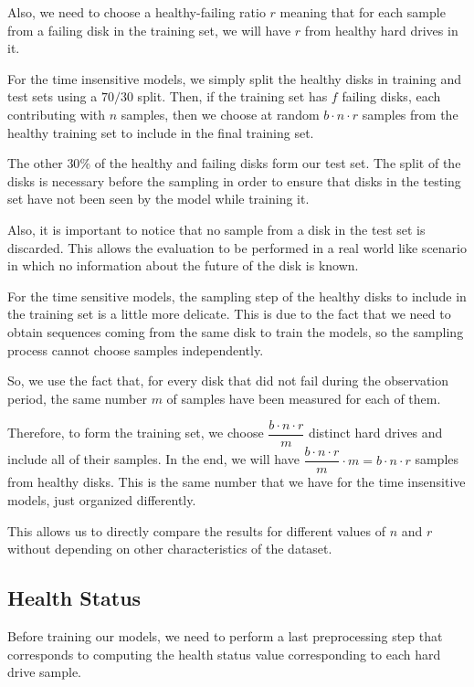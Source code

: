 Also, we need to choose a healthy-failing ratio $r$ meaning that for each sample from a failing disk in the training set, we will have $r$ from healthy hard drives in it.

For the time insensitive models, we simply split the healthy disks in training and test sets using a $70/30$ split.
Then, if the training set has $f$ failing disks, each contributing with $n$ samples, then we choose at random $b\cdot n \cdot r$ samples from the healthy training set to include in the final training set.

The other $30\%$ of the healthy and failing disks form our test set.
The split of the disks is necessary before the sampling in order to ensure that disks in the testing set have not been seen by the model while training it.

Also, it is important to notice that no sample from a disk in the test set is discarded.
This allows the evaluation to be performed in a real world like scenario in which no information about the future of the disk is known. 

For the time sensitive models, the sampling step of the healthy disks to include in the training set is a little more delicate.
This is due to the fact that we need to obtain sequences coming from the same disk to train the models, so the sampling process cannot choose samples independently.

So, we use the fact that, for every disk that did not fail during the observation period, the same number $m$ of samples have been measured for each of them.

Therefore, to form the training set, we choose $\dfrac{b\cdot n \cdot r}{m}$ distinct hard drives and include all of their samples.
In the end, we will have $\dfrac{b\cdot n \cdot r}{m} \cdot m = b\cdot n \cdot r$ samples from healthy disks.
This is the same number that we have for the time insensitive models, just organized differently.

This allows us to directly compare the results for different values of $n$ and $r$ without depending on other characteristics of the dataset.

\subsection{Health Status}\label{subsec:health_status}

Before training our models, we need to perform a last preprocessing step that corresponds to computing the health status value corresponding to each hard drive sample.

